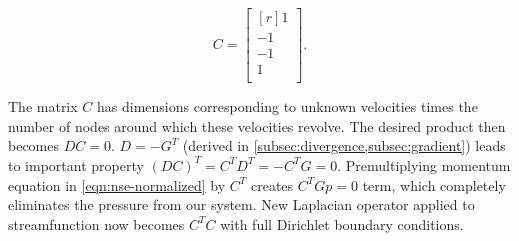 \documentclass{article}
\numberwithin{equation}{section}
\begin{document}
\begin{equation*}
  C = 
  \begin{bmatrix*}[r]
  1		\\
  -1	\\
  -1	\\
  1		\\
\end{bmatrix*}.
\end{equation*}

The matrix $C$ has dimensions corresponding to unknown velocities times the number of nodes around which these velocities revolve. 
The desired product then becomes $DC=0$. $D=-G^T$ (derived in \cref{subsec:divergence,subsec:gradient}) leads to important property $(DC)^T=C^TD^T=-C^TG=0$. 
Premultiplying momentum equation in \cref{eqn:nse-normalized} by $C^T$ creates $C^TGp=0$ term, which completely eliminates the pressure from our system. New Laplacian operator applied to streamfunction now becomes $C^TC$ with full Dirichlet boundary conditions.
\end{document}
